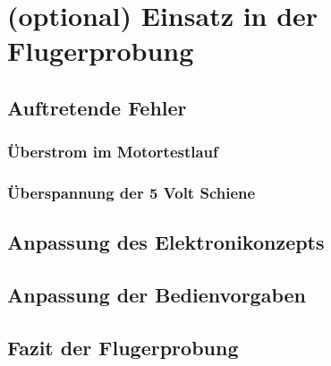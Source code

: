 \chapter{(optional) Einsatz in der Flugerprobung}\label{cha:Einsatz in der Flugerprobung}

\section{Auftretende Fehler}

\subsection{Überstrom im Motortestlauf}

\subsection{Überspannung der 5 Volt Schiene}

\section{Anpassung des Elektronikonzepts}

\section{Anpassung der Bedienvorgaben}

\section{Fazit der Flugerprobung}
